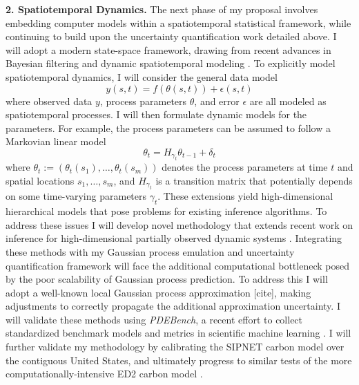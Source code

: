 \documentclass[12pt]{article}
\begin{document}
 \textbf{2. Spatiotemporal Dynamics.}
 The next phase of my proposal involves embedding computer models within a spatiotemporal statistical framework, while continuing to build upon the uncertainty quantification work detailed above. I will adopt a modern state-space framework, drawing from recent advances in Bayesian filtering 
 \cite{Sarkka} and dynamic spatiotemporal modeling \cite{Wikle, Hefley}.  
To explicitly model spatiotemporal dynamics, I will consider the general data model
 \[y(s, t) = f(\theta(s, t)) + \epsilon(s, t)\]
 where observed data $y$, process parameters $\theta$, and error $\epsilon$ are all modeled as spatiotemporal processes. I will then formulate dynamic models for the parameters. For example, the process parameters can be assumed to follow a Markovian linear model
 \[\theta_t = H_{\gamma_t} \theta_{t - 1} + \delta_t\]
 where $\theta_t := (\theta_t(s_1), \dots, \theta_t(s_m))$ denotes the process parameters at time $t$ and spatial locations $s_1, \dots, s_m$, 
 and $H_{\gamma_t}$ is a transition matrix that potentially depends on some time-varying parameters $\gamma_t$. These extensions yield high-dimensional 
 hierarchical models that pose problems for existing inference algorithms. To address these issues I will develop novel methodology that extends recent work on inference for high-dimensional partially observed dynamic systems \cite{Park}. Integrating these methods with my Gaussian process emulation and uncertainty quantification framework will face the additional computational bottleneck posed by the poor scalability of Gaussian process prediction. To address this I will adopt a well-known local Gaussian process approximation [cite], making adjustments to correctly propagate the additional approximation uncertainty. I will validate these methods using \textit{PDEBench}, a recent effort to collect standardized benchmark models and metrics in scientific machine learning \cite{Takamoto}. I will further validate my methodology by calibrating the SIPNET carbon model over the contiguous United States, and ultimately progress to similar tests of the more computationally-intensive ED2 carbon model \cite{Fer, Fer2}.
 
\end{document}
